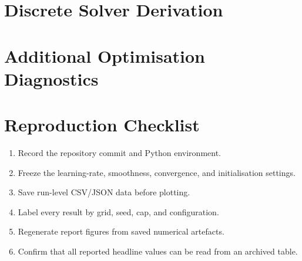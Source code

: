 \documentclass[9pt,a4paper,twocolumn,twoside]{rho-class/rho}
\newif\ifreportdraft
\newcommand{\draftnote}[1]{%
    \ifreportdraft
        \par\smallskip
        \noindent\textbf{\textsf{[TO COMPLETE]}} \textit{#1}
        \par\smallskip
    \fi
}
\begin{document}
\section{Discrete Solver Derivation}\label{app:l1-derivation}

    \draftnote{Derive the L1 weights and recurrence in Eqs.~\eqref{eq:l1-weights}--\eqref{eq:l1-update}. State how the endpoint singularity is handled, why the newest increment enters the denominator, and the memory/time complexity of the scan.}

\section{Additional Optimisation Diagnostics}\label{app:diagnostics}

    \draftnote{Place full per-seed convergence plots, zero-yield diagnostics, raw- versus bounded-control stability, alternative schedules, raw-space line scans, smoothness sensitivity, and higher-resolution cap-sweep tables here. Keep only decision-relevant summaries in the main text.}

\section{Reproduction Checklist}\label{app:reproduction}

    \begin{enumerate}
        \item Record the repository commit and Python environment.
        \item Freeze the learning-rate, smoothness, convergence, and initialisation settings.
        \item Save run-level CSV/JSON data before plotting.
        \item Label every result by grid, seed, cap, and configuration.
        \item Regenerate report figures from saved numerical artefacts.
        \item Confirm that all reported headline values can be read from an archived table.
    \end{enumerate}
\end{document}
